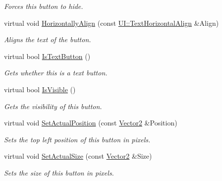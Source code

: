 \begin{DoxyCompactItemize}
\begin{DoxyCompactList}\small\item\em Forces this button to hide. \item\end{DoxyCompactList}\item 
virtual void \hyperlink{classMezzanine_1_1UI_1_1TextButton_a8bcaeb3e5d43fe6f180fa425c7d51384}{HorizontallyAlign} (const \hyperlink{namespaceMezzanine_1_1UI_aebbd46e62bb20d958f1915c1ec6cc549}{UI::TextHorizontalAlign} \&Align)
\begin{DoxyCompactList}\small\item\em Aligns the text of the button. \item\end{DoxyCompactList}\item 
virtual bool \hyperlink{classMezzanine_1_1UI_1_1TextButton_ad4cab393b8c00c43c1b8bfb878c73073}{IsTextButton} ()
\begin{DoxyCompactList}\small\item\em Gets whether this is a text button. \item\end{DoxyCompactList}\item 
virtual bool \hyperlink{classMezzanine_1_1UI_1_1TextButton_ab2b5f433ca97162e5b75e8cf02164740}{IsVisible} ()
\begin{DoxyCompactList}\small\item\em Gets the visibility of this button. \item\end{DoxyCompactList}\item 
virtual void \hyperlink{classMezzanine_1_1UI_1_1TextButton_adc3f524897031fffc7c25c4adc460d15}{SetActualPosition} (const \hyperlink{classMezzanine_1_1Vector2}{Vector2} \&Position)
\begin{DoxyCompactList}\small\item\em Sets the top left position of this button in pixels. \item\end{DoxyCompactList}\item 
virtual void \hyperlink{classMezzanine_1_1UI_1_1TextButton_a81171ff142c9e991daeec099bebfdc82}{SetActualSize} (const \hyperlink{classMezzanine_1_1Vector2}{Vector2} \&Size)
\begin{DoxyCompactList}\small\item\em Sets the size of this button in pixels. \item\end{DoxyCompactList}\item 

\end{DoxyCompactItemize}
